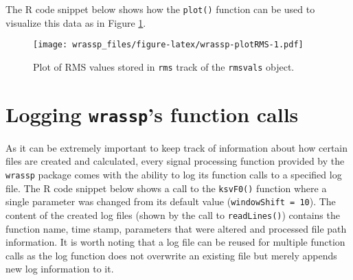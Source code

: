 \documentclass[
]{book}
\newenvironment{Shaded}{\begin{snugshade}}{\end{snugshade}}
\newcommand{\AttributeTok}[1]{\textcolor[rgb]{0.77,0.63,0.00}{#1}}
\newcommand{\CommentTok}[1]{\textcolor[rgb]{0.56,0.35,0.01}{\textit{#1}}}
\newcommand{\DecValTok}[1]{\textcolor[rgb]{0.00,0.00,0.81}{#1}}
\newcommand{\FunctionTok}[1]{\textcolor[rgb]{0.00,0.00,0.00}{#1}}
\newcommand{\NormalTok}[1]{#1}
\newcommand{\SpecialCharTok}[1]{\textcolor[rgb]{0.00,0.00,0.00}{#1}}
\newcommand{\StringTok}[1]{\textcolor[rgb]{0.31,0.60,0.02}{#1}}
\begin{document}
The R code snippet below shows how the \texttt{plot()} function can be used to visualize this data as in Figure \ref{fig:wrassp-plotRMS}.

\begin{Shaded}
\end{Shaded}

\begin{figure}
\centering
\texttt{[image: wrassp\_files/figure-latex/wrassp-plotRMS-1.pdf]}
\caption{\label{fig:wrassp-plotRMS}Plot of RMS values stored in \texttt{rms} track of the \texttt{rmsvals} object.}
\end{figure}

\hypertarget{sec:wrassp-logging}{%
\section{\texorpdfstring{Logging \texttt{wrassp}'s function calls}{Logging wrassp's function calls}}\label{sec:wrassp-logging}}

As it can be extremely important to keep track of information about how certain files are created and calculated, every signal processing function provided by the \texttt{wrassp} package comes with the ability to log its function calls to a specified log file. The R code snippet below shows a call to the \texttt{ksvF0()} function where a single parameter was changed from its default value (\texttt{windowShift\ =\ 10}). The content of the created log files (shown by the call to \texttt{readLines()}) contains the function name, time stamp, parameters that were altered and processed file path information. It is worth noting that a log file can be reused for multiple function calls as the log function does not overwrite an existing file but merely appends new log information to it.
\end{document}
